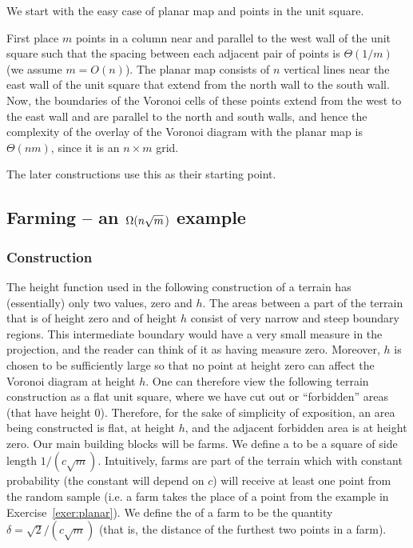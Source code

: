 \documentclass[12pt]{article}
\newcommand{\ts}{\hspace{0.6pt}}\renewcommand{\th}{\si{th}\xspace}
\providecommand{\si}[1]{#1}
\newcommand{\emphi}[1]{\emphic{#1}{#1}}
\newcommand{\pth}[2][\!]{#1\left({#2}\right)}
\newcommand{\west}{west\xspace}
\newcommand{\east}{east\xspace}
\newcommand{\south}{south\xspace}
\newcommand{\north}{north\xspace}
\newcommand{\seclab}[1]{\label{sec:#1}}
\newcommand{\exelab}[1]{\label{exer:#1}}
\newcommand{\exeref}[1]{Exercise~\ref{exer:#1}}
\newcommand{\diamConst}{\delta}
\begin{document}
\begin{example}
    We start with the easy case of planar map and points in the unit
    square.


    First place $m$ points in a column near and parallel to the \west
    wall of the unit square such that the spacing between each
    adjacent pair of points is $\Theta\pth{1/m}$ (we assume $m=O(n)$).
    The planar map consists of $n$ vertical lines near the \east wall
    of the unit square that extend from the \north wall to the \south wall.
    Now, the boundaries of the Voronoi cells of these points extend from the
    west to the east wall and are parallel to the north and south walls, and
    hence the complexity of the overlay of the Voronoi diagram with the planar
    map is $\Theta\pth{nm}$, since it is an $n \times m$ grid.

    The later constructions use this as their starting point.

    \exelab{planar}
\end{example}

\subsection{Farming -- an $\Omega\pth{n \sqrt{m}\ts \ts }$ example}
\seclab{farming}

\subsubsection{Construction}

The height function used in the following construction of a terrain
has (essentially) only two values, zero and $h$.  The areas between a
part of the terrain that is of height zero and of height $h$ consist
of very narrow and steep boundary regions. This intermediate boundary
would have a very small measure in the projection, and the reader can
think of it as having measure zero.  Moreover, $h$ is chosen to be
sufficiently large so that no point at height zero can affect the
Voronoi diagram at height $h$.  One can therefore view the following
terrain construction as a flat unit square, where we have cut out or
``forbidden'' areas (that have height $0$).  Therefore, for the sake
of simplicity of exposition, an area being constructed is flat, at
height $h$, and the adjacent forbidden area is at height zero.  Our
main building blocks will be farms.  We define a \emphi{farm} to be a
square of side length $1/(c\sqrt{m})$.  Intuitively, farms are part of
the terrain which with constant probability (the constant will depend
on $c$) will receive at least one point from the random sample (i.e. a
farm takes the place of a point from the example in \exeref{planar}).
We define the \emphi{diameter} of a farm to be the quantity
$\diamConst = \sqrt{2}/(c\sqrt{m})$ (that is, the distance of the
furthest two points in a farm).
\end{document}
